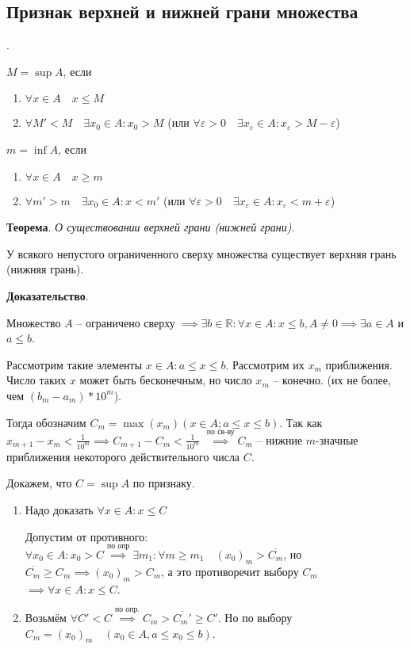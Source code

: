 \documentclass{article}
\newcommand{\bydef}{\stackrel{\text{по опр.}}{\implies}} %
\begin{document}
\subsection{Признак верхней и нижней грани множества}.

$M = \sup A$, если 
\begin{enumerate}
    \item $\forall x \in A \quad x \le M$
    \item $\forall M' < M \quad \exists x_0 \in A: x_0 > M$
    (или $\forall \varepsilon > 0 \quad \exists x_\varepsilon \in A: x_\varepsilon > M - \varepsilon$)
\end{enumerate}

$m = \inf A$, если 
\begin{enumerate}
    \item $\forall x \in A \quad x \ge m$
    \item $\forall m' > m \quad \exists x_0 \in A: x < m'$
    (или $\forall \varepsilon > 0 \quad \exists x_\varepsilon \in A: x_\varepsilon < m + \varepsilon$)
\end{enumerate}

\textbf{Теорема}. \textit{О существовании верхней грани (нижней грани)}.

У всякого непустого ограниченного сверху множества существует верхняя грань (нижняя грань).

\textbf{Доказательство}.

Множество $A$ -- ограничено сверху $\implies \exists b \in \mathbb{R}: \forall x \in A:
x \le b, A \ne 0 \implies \exists a \in A$ и $a \le b$.

Рассмотрим такие элементы $x \in A: a \le x \le b$. Рассмотрим их $x_m$ приближения.
Число таких $x$ может быть бесконечным, но число $x_m$ -- конечно.
(их не более, чем $(b_m - a_m) * 10^m$). 

Тогда обозначим $C_m = \max (x_m) (x \in A; a \le x \le b)$.
Так как $x_{m+1} - x_m < \frac{1}{10^m} \implies C_{m+1} - C_m < \frac{1}{10^m}$
$\stackrel{\text{по св-ву}}{\implies} C_m$ -- нижние $m$-значные приближения некоторого 
действительного числа $C$.

Докажем, что $C = \sup A$ по признаку.
\begin{enumerate}
    \item Надо доказать $\forall x \in A: x \le C$
    
    Допустим от противного: $\forall x_0 \in A: x_0 > C \stackrel{\text{по опр}}{\implies}
    \exists m_1: \forall m \ge m_1 \quad (x_0)_m > \overline{C_m}$, но
    $\overline{C_m} \ge C_m \implies (x_0)_m > C_m$, а это противоречит выбору $C_m$
    $\implies \forall x \in A: x \le C$.

    \item Возьмём $\forall C' < C \bydef C_m > \overline{C_m'} \ge C'$.
    Но по выбору $C_m = (x_0)_m \quad (x_0 \in A, a \le x_0 \le b)$.
\end{enumerate}
\end{document}
